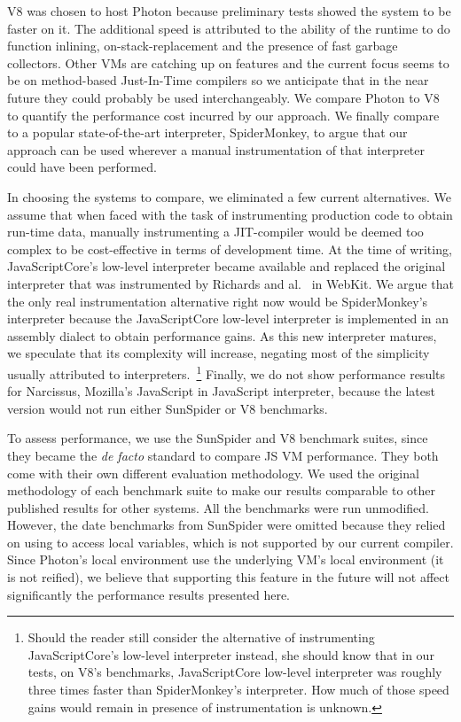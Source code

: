 V8 was chosen to host Photon because preliminary tests showed the system to be
faster on it. The additional speed is attributed to the ability of the runtime
to do function inlining, on-stack-replacement and the presence of fast garbage
collectors. Other VMs are catching up on features and the current focus seems
to be on method-based Just-In-Time compilers so we anticipate that in the near
future they could probably be used interchangeably. We compare Photon to V8 to
quantify the performance cost incurred by our approach.  We finally compare to a
popular state-of-the-art interpreter, SpiderMonkey, to argue that our approach
can be used wherever a manual instrumentation of that interpreter could have
been performed. 

In choosing the systems to compare, we eliminated a few current alternatives.
We assume that when faced with the task of instrumenting production code to
obtain run-time data, manually instrumenting a JIT-compiler would be deemed too
complex to be cost-effective in terms of development time. At the time of
writing, JavaScriptCore's low-level interpreter became available and replaced
the original interpreter that was instrumented by Richards and
al.~\cite{behavior_js} in WebKit.  We argue that the only real instrumentation
alternative right now would be SpiderMonkey's interpreter because the
JavaScriptCore low-level interpreter is implemented in an assembly dialect to
obtain performance gains. As this new interpreter matures, we speculate that
its complexity will increase, negating most of the simplicity usually
attributed to interpreters.~\footnote{Should the reader still consider the
alternative of instrumenting JavaScriptCore's low-level interpreter instead,
she should know that in our tests, on V8's benchmarks, JavaScriptCore low-level
interpreter was roughly three times faster than SpiderMonkey's interpreter. How
much of those speed gains would remain in presence of instrumentation is
unknown.} Finally, we do not show performance results for Narcissus, Mozilla's
JavaScript in JavaScript interpreter, because the latest version would not run
either SunSpider or V8 benchmarks.

To assess performance, we use the SunSpider and V8 benchmark suites, since they
became the \textit{de facto} standard to compare JS VM performance. They both
come with their own different evaluation methodology. We used the original
methodology of each benchmark suite to make our results comparable to other
published results for other systems. All the benchmarks were run unmodified.
However, the date benchmarks from SunSpider were omitted because they relied on
using  to access local variables, which is not supported by our
current compiler.  Since Photon's local environment use the underlying VM's
local environment (it is not reified), we believe that supporting this feature
in the future will not affect significantly the performance results presented
here.

